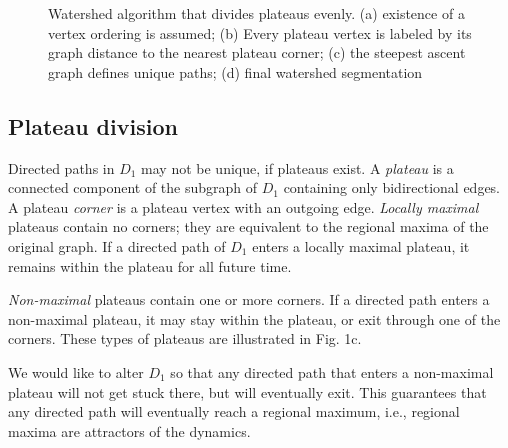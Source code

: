 \documentclass{article}
\begin{document}
\begin{figure}

  \protect\caption{Watershed algorithm that divides plateaus
    evenly. (a) existence of a vertex ordering is assumed; (b) Every
    plateau vertex is labeled by its graph distance to the nearest
    plateau corner; (c) the steepest ascent graph defines unique paths;
    (d) final watershed segmentation}
\end{figure}

\subsection{Plateau division}
Directed paths in $D_1$ may not be unique, if plateaus exist.  A
\emph{plateau} is a connected component of the subgraph of $D_1$
containing only bidirectional edges.  A plateau \emph{corner} is a
plateau vertex with an outgoing edge.
\emph{Locally maximal} plateaus contain no corners; they are
equivalent to the regional maxima of the original graph.  If a
directed path of $D_1$ enters a locally maximal plateau, it remains
within the plateau for all future time.

\emph{Non-maximal} plateaus contain one or more corners.  If a
directed path enters a non-maximal plateau, it may stay within the
plateau, or exit through one of the corners.  These types
of plateaus are illustrated in Fig. 1c.

We would like to alter $D_1$ so that any directed path that enters a
non-maximal plateau will not get stuck there, but will eventually
exit.  This guarantees that any directed path will eventually reach a
regional maximum, i.e., regional maxima are attractors of the dynamics.
\end{document}
